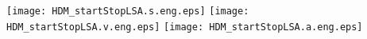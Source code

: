 \documentclass[a4paper,12pt]{article}
\begin{document}

\begin{center}
\texttt{[image: HDM\_startStopLSA.s.eng.eps]} 
\texttt{[image: HDM\_startStopLSA.v.eng.eps]}
\texttt{[image: HDM\_startStopLSA.a.eng.eps]}
\end{center}

\end{document}
